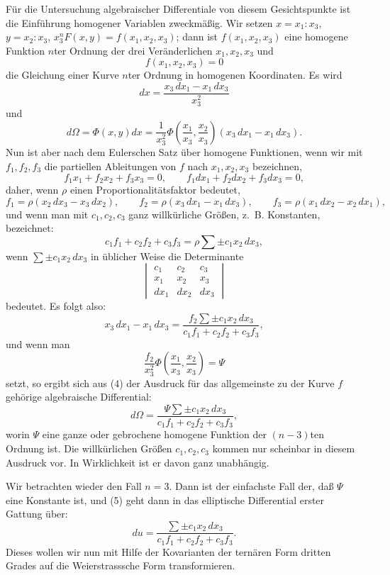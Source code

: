 \documentclass[11pt]{article}
\begin{document}
Für die Untersuchung algebraischer Differentiale von diesem Gesichtspunkte ist die Einführung homogener Variablen zweckmäßig. Wir setzen $x=x_1:x_3$, $y=x_2:x_3$, $x_3^nF(x,y)=f(x_1,x_2,x_3)$; dann ist $f(x_1,x_2,x_3)$ eine homogene Funktion $n$ter Ordnung der drei Veränderlichen $x_1,x_2,x_3$ und
\begin{equation}
f(x_1,x_2,x_3)=0
\tag{3}
\end{equation}
die Gleichung einer Kurve $n$ter Ordnung in homogenen Koordinaten. Es wird
\[
dx=\frac{x_3\,dx_1-x_1\,dx_3}{x_3^2}
\]
und
\begin{equation}
d\Omega=\Phi(x,y)dx=\frac1{x_3^2}\Phi\left(\frac{x_1}{x_3},\frac{x_2}{x_3}\right)(x_3\,dx_1-x_1\,dx_3).
\tag{4}
\end{equation}
Nun ist aber nach dem Eulerschen Satz über homogene Funktionen, wenn wir mit $f_1,f_2,f_3$ die partiellen Ableitungen von $f$ nach $x_1,x_2,x_3$ bezeichnen,
\[
f_1x_1+f_2x_2+f_3x_3=0,
\qquad
f_1dx_1+f_2dx_2+f_3dx_3=0,
\]
daher, wenn $\rho$ einen Proportionalitätsfaktor bedeutet,
\[
f_1=\rho(x_2\,dx_3-x_3\,dx_2),\qquad
f_2=\rho(x_3\,dx_1-x_1\,dx_3),\qquad
f_3=\rho(x_1\,dx_2-x_2\,dx_1),
\]
und wenn man mit $c_1,c_2,c_3$ ganz willkürliche Größen, z.~B. Konstanten, bezeichnet:
\[
c_1f_1+c_2f_2+c_3f_3=\rho\sum\pm c_1x_2\,dx_3,
\]
wenn $\sum\pm c_1x_2\,dx_3$ in üblicher Weise die Determinante
\[
\begin{vmatrix}
c_1&c_2&c_3\\
x_1&x_2&x_3\\
dx_1&dx_2&dx_3
\end{vmatrix}
\]
bedeutet. Es folgt also:
\[
x_3\,dx_1-x_1\,dx_3=\frac{f_2\sum\pm c_1x_2\,dx_3}{c_1f_1+c_2f_2+c_3f_3},
\]
und wenn man
\[
\frac{f_2}{x_3^2}\Phi\left(\frac{x_1}{x_3},\frac{x_2}{x_3}\right)=\Psi
\]
setzt, so ergibt sich aus (4) der Ausdruck für das allgemeinste zu der Kurve $f$ gehörige algebraische Differential:
\begin{equation}
d\Omega=\frac{\Psi\sum\pm c_1x_2\,dx_3}{c_1f_1+c_2f_2+c_3f_3},
\tag{5}
\end{equation}
worin $\Psi$ eine ganze oder gebrochene homogene Funktion der $(n-3)$ten Ordnung ist. Die willkürlichen Größen $c_1,c_2,c_3$ kommen nur scheinbar in diesem Ausdruck vor. In Wirklichkeit ist er davon ganz unabhängig.

Wir betrachten wieder den Fall $n=3$. Dann ist der einfachste Fall der, daß $\Psi$ eine Konstante ist, und (5) geht dann in das elliptische Differential erster Gattung über:
\begin{equation}
du=\frac{\sum\pm c_1x_2\,dx_3}{c_1f_1+c_2f_2+c_3f_3}.
\tag{6}
\end{equation}
Dieses wollen wir nun mit Hilfe der Kovarianten der ternären Form dritten Grades auf die Weierstrasssche Form transformieren.
\end{document}
